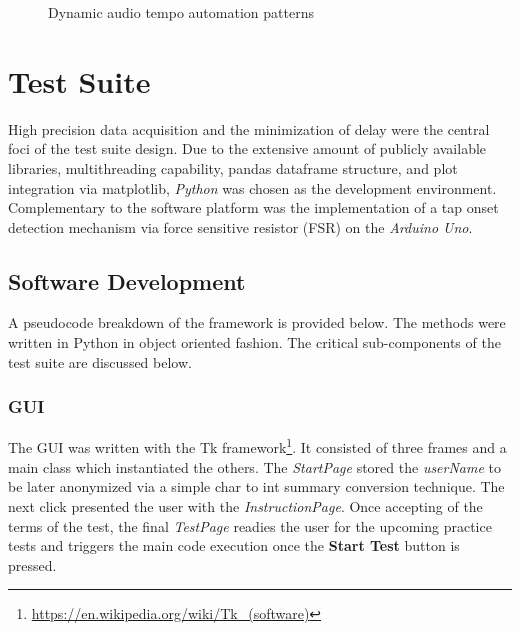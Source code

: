 \begin{figure}[H]
    \centering
    \caption{Dynamic audio tempo automation patterns}
        \qquad
    \label{fig:dynamic_audio}
\end{figure}

\section{Test Suite}
High precision data acquisition and the minimization of delay were the central foci of the test suite design. Due to the extensive amount of publicly available libraries, multithreading capability, pandas dataframe structure, and plot integration via matplotlib, \textit{Python} was chosen as the development environment. Complementary to the software platform was the implementation of a tap onset detection mechanism via force sensitive resistor (FSR) on the \textit{Arduino Uno}. 

\subsection{Software Development} \label{development}
A pseudocode breakdown of the framework is provided below. The methods were written in Python in object oriented fashion. The critical sub-components of the test suite are discussed below. 

\subsubsection{GUI}
The GUI was written with the Tk framework\footnote{\url{https://en.wikipedia.org/wiki/Tk_(software)}}. It consisted of three frames and a main class which instantiated the others. The \textit{StartPage} stored the \textit{userName} to be later anonymized via a simple char to int summary conversion technique. The next click presented the user with the \textit{InstructionPage}. Once accepting of the terms of the test, the final \textit{TestPage} readies the user for the upcoming practice tests and triggers the main code execution once the \textbf{Start Test} button is pressed.
